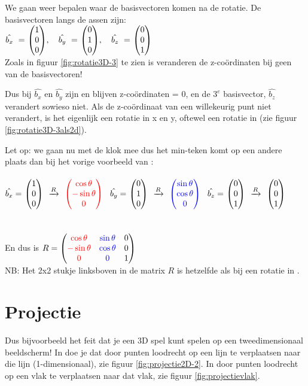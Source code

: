 We gaan weer bepalen waar de basisvectoren komen na de rotatie. De basisvectoren langs de assen zijn: \\
$ \hat{b_x} \ = \ \vecdrie{1}{0}{0}, \quad \hat{b_y} \ = \ \vecdrie{0}{1}{0},  \quad \hat{b_z} \ = \ \vecdrie{0}{0}{1} $ \\
Zoals in figuur \ref{fig:rotatie3D-3} te zien is veranderen de z-coördinaten bij geen van de basisvectoren! 


Dus bij  $ \hat{b_x} $ en $  \hat{b_y} $  zijn en blijven z-coördinaten = 0, en de $ 3^e $ basisvector, $  \hat{b_z} $  verandert sowieso niet. Als de z-coördinaat van een willekeurig punt niet verandert, is het eigenlijk een rotatie in x en y, oftewel een rotatie in \RT (zie figuur \ref{fig:rotatie3D-3als2d}).  

Let op: we gaan nu met de klok mee dus het min-teken komt op een andere plaats dan bij het vorige voorbeeld van \RT: \\ \\
$ \hat{b_x}  = \ \vecdrie{1}{0}{0}  \ \  \xrightarrow{R} \ \  \vecdrie[red]{\cos \theta}{- \sin \theta}{0}\ $  
\qquad  $ \hat{b_y}  = \ \vecdrie{0}{1}{0}  \ \  \xrightarrow{R}  \ \ \vecdrie[blue]{\sin \theta}{ \cos \theta}{0}\ $  
\qquad  $ \hat{b_z}  = \ \vecdrie{0}{0}{1}   \  \  \xrightarrow{R}  \ \ \vecdrie{0}{0}{1}\ $  \\ \\ \\
En dus is $ R = 
\begin{pmatrix} {\color{red}\cos \theta} & {\color{blue}\sin \theta} & {0}  \\ {\color{red}- \sin \theta} & {\color{blue}\cos \theta} & {0} \\ {\color{red}0} & {\color{blue}0} & {1} \end{pmatrix} $ \\ 
NB: Het 2x2 stukje linksboven in de matrix $ R $ is hetzelfde als bij een rotatie in \RT.

\section{Projectie}		
  Dus bijvoorbeeld het feit dat je een 3D spel kunt spelen op een tweedimensionaal beeldscherm! In \RT doe je dat door punten loodrecht op een lijn te verplaatsen naar die lijn (1-dimensionaal), zie figuur \ref{fig:projectie2D-2}. In \RD door punten loodrecht op een vlak te verplaatsen naar dat vlak, zie figuur \ref{fig:projectievlak}.
